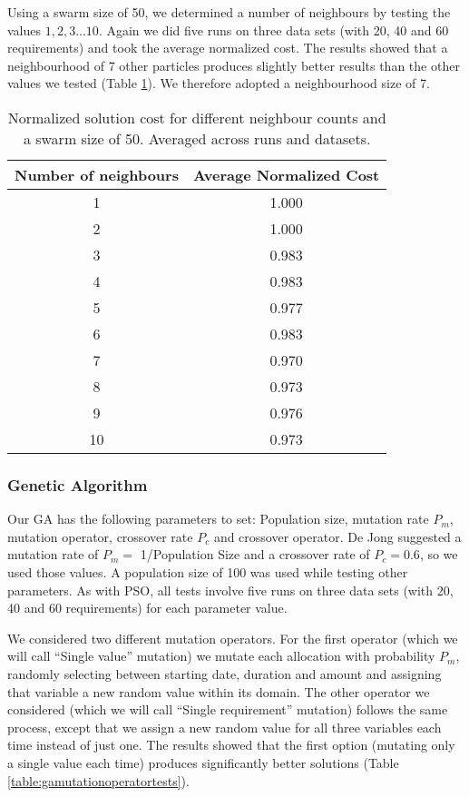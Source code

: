 \documentclass{sig-alternate}
\begin{document}
Using a swarm size of 50, we determined a number of neighbours by testing the values $1,2,3...10$. Again we did five runs on three data sets (with 20, 40 and 60 requirements) and took the average normalized cost. The results showed that a neighbourhood of 7 other particles produces slightly better results than the other values we tested (Table \ref{table:psoneighbourtests}). We therefore adopted a neighbourhood size of 7.
\begin{table}
	\centering
	\begin{tabular}{ | c | c | }
		\hline
		Number of neighbours & Average Normalized Cost \\ \hline
		1 & 1.000 \\ \hline
		2 & 1.000 \\ \hline
		3 & 0.983 \\ \hline
		4 & 0.983 \\ \hline
		5 & 0.977 \\ \hline
		6 & 0.983 \\ \hline
		7 & 0.970 \\ \hline
		8 & 0.973 \\ \hline
		9 & 0.976 \\ \hline
		10& 0.973 \\ \hline
	\end{tabular}
	\caption{Normalized solution cost for different neighbour counts and a swarm size of 50. Averaged across runs and datasets.}
	\label{table:psoneighbourtests}
\end{table}

\subsubsection{Genetic Algorithm} \label{sec:gaparams}
Our GA has the following parameters to set: Population size, mutation rate $P_m$, mutation operator, crossover rate $P_c$ and crossover operator.
De Jong suggested a mutation rate of $P_m =$ 1/Population Size and a crossover rate of $P_c = 0.6$\cite{DeJong1975}, so we used those values. A population size of 100 was used while testing other parameters.
As with PSO, all tests involve five runs on three data sets (with 20, 40 and 60 requirements) for each parameter value.

We considered two different mutation operators. For the first operator (which we will call ``Single value'' mutation) we mutate each allocation with probability $P_m$, randomly selecting between starting date, duration and amount and assigning that variable a new random value within its domain. The other operator we considered (which we will call ``Single requirement'' mutation) follows the same process, except that we assign a new random value for all three variables each time instead of just one. The results showed that the first option (mutating only a single value each time) produces significantly better solutions (Table \ref{table:gamutationoperatortests}).
\end{document}
